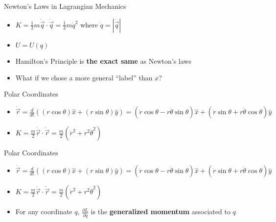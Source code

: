 \documentclass[10pt,xcolor={table,dvipsnames},t]{beamer}
\begin{document}
\begin{frame}{Newton's Laws in Lagrangian Mechanics}
    \begin{itemize}
        \item $K = \frac{1}{2}m\dot{\Vec{q}} \cdot \dot{\Vec{q}} = \frac{1}{2} m\dot{q}^2$ where $\dot{q} = |\dot{\Vec{q}}|$
        \item $U = U(q)$
        \pause\item Hamilton's Principle is \textbf{the exact same} as Newton's laws
        \item What if we chose a more general ``label'' than $x$?
    \end{itemize}

\end{frame}

\begin{frame}{Polar Coordinates}

\begin{itemize}
    \item $\dot{\Vec{r}} = \frac{d}{dt} \left((r \cos{\theta})\hat{x} + (r\sin{\theta}) \hat{y}\right) = (\dot{r} \cos{\theta} - r \dot{\theta} \sin{\theta})\hat{x} + (\dot{r}\sin{\theta} + r \dot{\theta} \cos{\theta}) \hat{y}$
    \item $K = \frac{m}{2}\dot{\Vec{r}} \cdot \dot{\Vec{r}} =\frac{m}{2} \left(\dot{r}^2 + r^2 \dot{\theta}^2\right)$

\end{itemize}
    
\end{frame}

\begin{frame}{Polar Coordinates}

\begin{itemize}
    \item $\dot{\Vec{r}} = \frac{d}{dt} \left((r \cos{\theta})\hat{x} + (r\sin{\theta}) \hat{y}\right) = (\dot{r} \cos{\theta} - r \dot{\theta} \sin{\theta})\hat{x} + (\dot{r}\sin{\theta} + r \dot{\theta} \cos{\theta}) \hat{y}$
    \item $K = \frac{m}{2}\dot{\Vec{r}} \cdot \dot{\Vec{r}} =\frac{m}{2} \left(\dot{r}^2 + r^2 \dot{\theta}^2\right)$
    \vspace{90pt}
    \item For any coordinate $q$, $\frac{\partial L}{\partial \dot{q}}$ is the \textbf{generalized momentum} associated to $q$
\end{itemize}

\end{frame}
\end{document}
